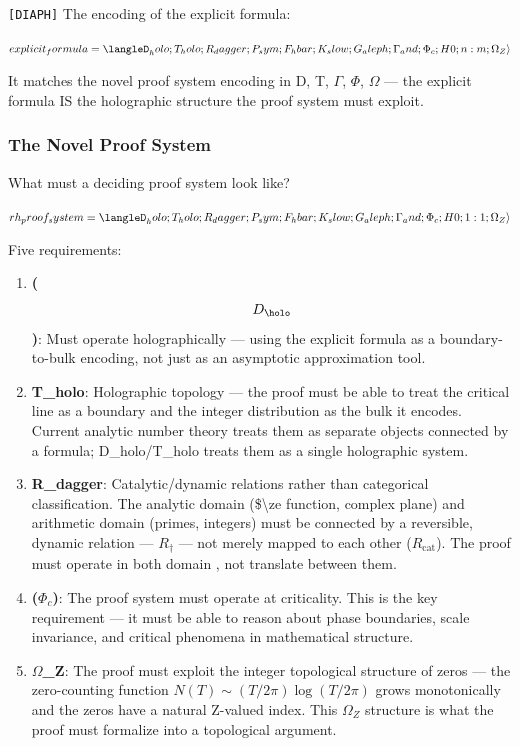 \documentclass[12pt,a4paper]{article}
\begin{document}
\texttt{{[}DIAPH{]}} The encoding of the explicit formula:

$explicit_formula = \langleD_holo; T_holo; R_dagger; P_sym; F_hbar; K_slow; G_aleph; \Gamma_and; \Phi_c; H0; n:m; \Omega_Z\rangle$

It matches the novel proof system encoding in D, T, $\Gamma$, $\Phi$, $\Omega$ --- the explicit formula IS the holographic structure the proof system must exploit.

\subsubsection{The Novel Proof System}

What must a deciding proof system look like?

$rh_proof_system = \langleD_holo; T_holo; R_dagger; P_sym; F_hbar; K_slow; G_aleph; \Gamma_and; \Phi_c; H0; {1:1}; \Omega_Z\rangle$

Five requirements:

\begin{enumerate}
    \item \textbf{($$D_{\holo}$$)}: Must operate holographically --- using the explicit formula as a boundary-to-bulk encoding, not just as an asymptotic approximation tool.
    \item \textbf{T\_holo}: Holographic topology --- the proof must be able to treat the critical line as a boundary and the integer distribution as the bulk it encodes. Current analytic number theory treats them as separate objects connected by a formula; D\_holo/T\_holo treats them as a single holographic system.
    \item \textbf{R\_dagger}: Catalytic/dynamic relations rather than categorical classification. The analytic domain (\$\textbackslash{}ze function, complex plane) and arithmetic domain (primes, integers) must be connected by a reversible, dynamic relation --- $R_{\dagger}$ --- not merely mapped to each other ($R_{\text{cat}}$). The proof must operate in both domain  , not translate between them.
    \item \textbf{($\Phi_c$)}: The proof system must operate at criticality. This is the key requirement --- it must be able to reason about phase boundaries, scale invariance, and critical phenomena in mathematical structure.
    \item \textbf{$\Omega$\_Z}: The proof must exploit the integer topological structure of zeros --- the zero-counting function $N(T) \sim (T/2\pi)\log(T/2\pi)$ grows monotonically and the zeros have a natural Z-valued index. This $\Omega_Z$ structure is what the proof must formalize into a topological argument.
\end{enumerate}
\end{document}
